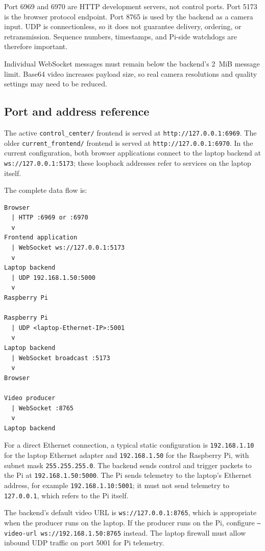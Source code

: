 \documentclass[11pt]{article}
\begin{document}
Port 6969 and 6970 are HTTP development servers, not control ports. Port
5173 is the browser protocol endpoint. Port 8765 is used by the backend as a
camera input. UDP is connectionless, so it does not guarantee delivery,
ordering, or retransmission. Sequence numbers, timestamps, and Pi-side
watchdogs are therefore important.

Individual WebSocket messages must remain below the backend's 2~MiB message
limit. Base64 video increases payload size, so real camera resolutions and
quality settings may need to be reduced.

\subsection{Port and address reference}

The active \texttt{control\_center/} frontend is served at
\texttt{http://127.0.0.1:6969}. The older \texttt{current\_frontend/}
frontend is served at \texttt{http://127.0.0.1:6970}. In the current
configuration, both browser applications connect to the laptop backend at
\texttt{ws://127.0.0.1:5173}; these loopback addresses refer to services on
the laptop itself.

The complete data flow is:

\begin{lstlisting}
Browser
  | HTTP :6969 or :6970
  v
Frontend application
  | WebSocket ws://127.0.0.1:5173
  v
Laptop backend
  | UDP 192.168.1.50:5000
  v
Raspberry Pi

Raspberry Pi
  | UDP <laptop-Ethernet-IP>:5001
  v
Laptop backend
  | WebSocket broadcast :5173
  v
Browser

Video producer
  | WebSocket :8765
  v
Laptop backend
\end{lstlisting}

For a direct Ethernet connection, a typical static configuration is
\texttt{192.168.1.10} for the laptop Ethernet adapter and
\texttt{192.168.1.50} for the Raspberry Pi, with subnet mask
\texttt{255.255.255.0}. The backend sends control and trigger packets to the
Pi at \texttt{192.168.1.50:5000}. The Pi sends telemetry to the laptop's
Ethernet address, for example \texttt{192.168.1.10:5001}; it must not send
telemetry to \texttt{127.0.0.1}, which refers to the Pi itself.

The backend's default video URL is \texttt{ws://127.0.0.1:8765}, which is
appropriate when the producer runs on the laptop. If the producer runs on the
Pi, configure \texttt{--video-url ws://192.168.1.50:8765} instead. The
laptop firewall must allow inbound UDP traffic on port 5001 for Pi telemetry.
\end{document}
